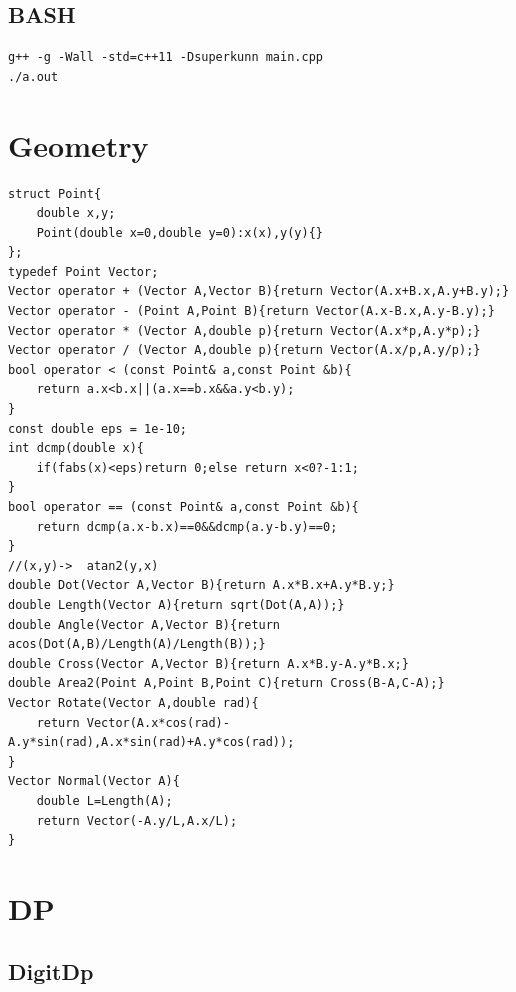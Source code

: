 \documentclass[twoside]{article}
\begin{document}
\subsection{BASH}
\begin{lstlisting}
g++ -g -Wall -std=c++11 -Dsuperkunn main.cpp
./a.out
\end{lstlisting}
\clearpage\section{Geometry}
\begin{lstlisting}
struct Point{
    double x,y;
    Point(double x=0,double y=0):x(x),y(y){}
};
typedef Point Vector;
Vector operator + (Vector A,Vector B){return Vector(A.x+B.x,A.y+B.y);}
Vector operator - (Point A,Point B){return Vector(A.x-B.x,A.y-B.y);}
Vector operator * (Vector A,double p){return Vector(A.x*p,A.y*p);}
Vector operator / (Vector A,double p){return Vector(A.x/p,A.y/p);}
bool operator < (const Point& a,const Point &b){
    return a.x<b.x||(a.x==b.x&&a.y<b.y);
}
const double eps = 1e-10;
int dcmp(double x){
    if(fabs(x)<eps)return 0;else return x<0?-1:1;
}
bool operator == (const Point& a,const Point &b){
    return dcmp(a.x-b.x)==0&&dcmp(a.y-b.y)==0;
}
//(x,y)->  atan2(y,x)
double Dot(Vector A,Vector B){return A.x*B.x+A.y*B.y;}
double Length(Vector A){return sqrt(Dot(A,A));}
double Angle(Vector A,Vector B){return acos(Dot(A,B)/Length(A)/Length(B));}
double Cross(Vector A,Vector B){return A.x*B.y-A.y*B.x;}
double Area2(Point A,Point B,Point C){return Cross(B-A,C-A);}
Vector Rotate(Vector A,double rad){
    return Vector(A.x*cos(rad)-A.y*sin(rad),A.x*sin(rad)+A.y*cos(rad));
}
Vector Normal(Vector A){
    double L=Length(A);
    return Vector(-A.y/L,A.x/L);
}
\end{lstlisting}
\clearpage\section{DP}
\subsection{DigitDp}
\end{document}
